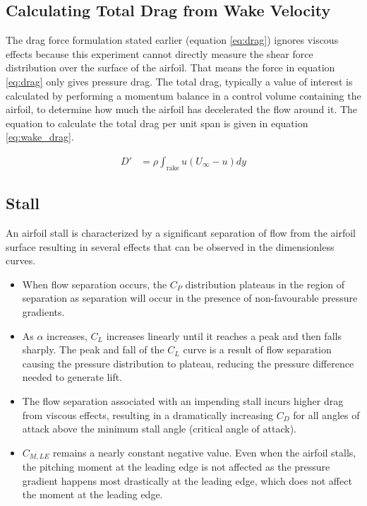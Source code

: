 \documentclass[runningheads]{llncs}
\begin{document}
\subsection{Calculating Total Drag from Wake Velocity}

\noindent
The drag force formulation stated earlier (equation \ref{eq:drag}) ignores viscous effects because this experiment cannot directly measure the shear force distribution over the surface of the airfoil. That means the force in equation \ref{eq:drag} only gives pressure drag. The total drag, typically a value of interest is calculated by performing a momentum balance in a control volume containing the airfoil, to determine how much the airfoil has decelerated the flow around it. The equation to calculate the total drag per unit span is given in equation \ref{eq:wake_drag}.\newline

\begin{align}
    D' &= \rho\int_{\text{rake}} u (U_\infty - u) dy \label{eq:wake_drag}
\end{align}

\subsection{Stall}

\noindent
An airfoil stall is characterized by a significant separation of flow from the airfoil surface resulting in several effects that can be observed in the dimensionless curves.

\begin{itemize}

    \item When flow separation occurs, the $C_P$ distribution plateaus in the region of separation as separation will occur in the presence of non-favourable pressure gradients.
    
    \item As $\alpha$ increases, $C_L$ increases linearly until it reaches a peak and then falls sharply. The peak and fall of the $C_L$ curve is a result of flow separation causing the pressure distribution to plateau, reducing the pressure difference needed to generate lift.
    
    \item The flow separation associated with an impending stall incurs higher drag from viscous effects, resulting in a dramatically increasing $C_D$ for all angles of attack above the minimum stall angle (critical angle of attack).
    
    \item $C_{M, LE}$ remains a nearly constant negative value. Even when the airfoil stalls, the pitching moment at the leading edge is not affected as the pressure gradient happens most drastically at the leading edge, which does not affect the moment at the leading edge.
    
\end{itemize}
\end{document}
